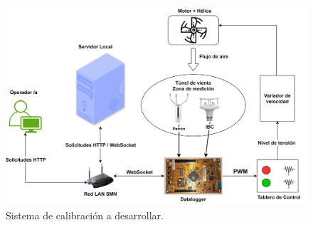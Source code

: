 \begin{figure}[H]
    \centering
    \includegraphics[width=1\linewidth]{Figuras/introduccion/sistemaDesarrollado.png}
    \caption{Sistema de calibración a desarrollar.} 
    \label{fig:sistemaDesarrollado}
\end{figure}


